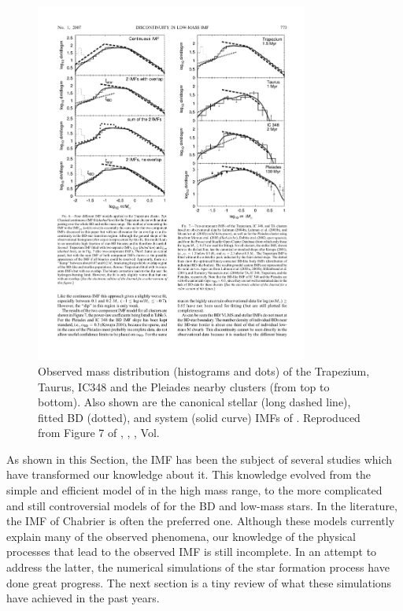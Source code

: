  \begin{figure}[htbp]
\begin{center}
\includegraphics[width=0.8\textwidth]{background/Figures/F7_Thies2007.pdf}
\caption{Observed mass distribution (histograms and dots) of the Trapezium, Taurus, IC348 and the Pleiades nearby clusters (from top to bottom). Also shown are the canonical stellar (long dashed line), fitted BD (dotted), and system (solid curve) IMFs of \citet{Thies2007} . Reproduced from Figure 7 of \citet{Thies2007}, \textit{}, , Vol. }
\label{fig:IMFThies2007}
\end{center}
\end{figure}
 
As shown in this Section, the IMF has been the subject of several studies which have transformed our knowledge about it. This knowledge evolved from the simple and efficient model of \citet{Salpeter1955} in the high mass range, to the more complicated and still controversial models of \citet{Thies2007, 2013pss5.book..115K} for the BD and low-mass stars. In the literature, the IMF of Chabrier \citep{Chabrier2003a,Chabrier2003b,Chabrier2005} is often the preferred one. Although these models currently explain many of the observed phenomena, our knowledge of the physical processes that lead to the observed IMF is still incomplete. In an attempt to address the latter, the numerical simulations of the star formation process have done great progress. The next section is a tiny review of what these simulations have achieved in the past years.


